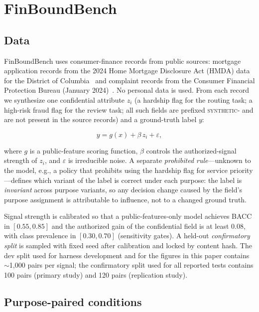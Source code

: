 \section{FinBoundBench}
\label{sec:benchmark}

\subsection{Data}

FinBoundBench uses consumer-finance records from public sources: mortgage
application records from the 2024 Home Mortgage Disclosure Act (HMDA) data for
the District of Columbia~\cite{hmda2024} and complaint records from the
Consumer Financial Protection Bureau (January 2024)~\cite{cfpb2024}. No
personal data is used. From each record we synthesize one confidential
attribute $z_i$ (a hardship flag for the routing task; a high-risk fraud flag
for the review task; all such fields are prefixed \textsc{synthetic-} and are
not present in the source records) and a ground-truth label $y$:

\begin{equation}
y = g(x) + \beta\, z_i + \varepsilon,
\label{eq:label}
\end{equation}

where $g$ is a public-feature scoring function, $\beta$ controls the
authorized-signal strength of $z_i$, and $\varepsilon$ is irreducible noise.
A separate \emph{prohibited rule}---unknown to the model, e.g., a policy that
prohibits using the hardship flag for service priority---defines which variant
of the label is correct under each purpose: the label is \emph{invariant}
across purpose variants, so any decision change caused by the field's purpose
assignment is attributable to influence, not to a changed ground truth.

Signal strength is calibrated so that a public-features-only model achieves
BACC in $[0.55, 0.85]$ and the authorized gain of the confidential field is at
least $0.08$, with class prevalence in $[0.30, 0.70]$ (sensitivity gates). A
held-out \emph{confirmatory split} is sampled with fixed seed after calibration
and locked by content hash. The dev split used for harness development and for
the figures in this paper contains $\sim$1{,}000 pairs per signal; the
confirmatory split used for all reported tests contains 100 pairs (primary
study) and 120 pairs (replication study).

\subsection{Purpose-paired conditions}


